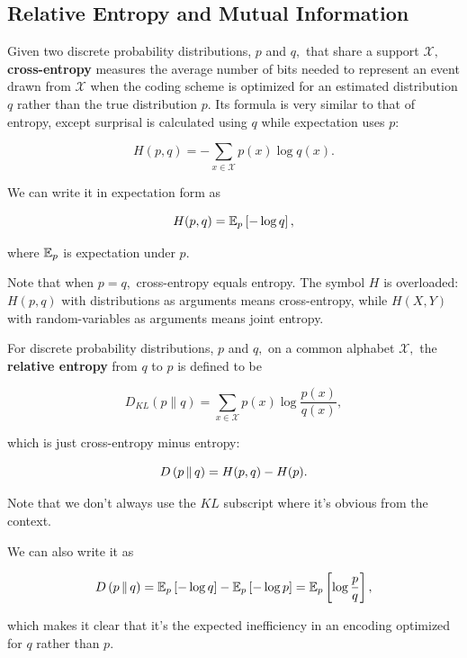 \documentclass{article}
\begin{document}
\subsection{Relative Entropy and Mutual Information}

\begin{definition}
Given two discrete probability distributions, $p$ and $q,$ that share a support $\mathcal{X},$ \textbf{cross-entropy} measures the average number of bits needed to represent an event drawn from $\mathcal{X}$ when the coding scheme is optimized for an estimated distribution $q$ rather than the true distribution $p.$ Its formula is very similar to that of \@{entropy}, except \@{surprisal} is calculated using $q$ while \@{expectation} uses $p$:

\[ H(p,q) = - \sum_{x \in \mathcal{X}} p(x) \log{q(x)}. \]

We can write it in \@{expectation} form as

\[ H(p,q) = \mathbb{E}_p \left[- \log{q}\right], \]

where $\mathbb{E}_p$ is expectation under $p.$
\end{definition}

Note that when $p = q,$ \@{cross-entropy} equals \@{entropy}. The symbol $H$ is overloaded: $H(p,q)$ with distributions as arguments means \@{cross-entropy}, while $H(X,Y)$ with \@{random-variables} as arguments means joint entropy.

\begin{definition}[KL Divergence]
	For discrete probability distributions, $p$ and $q,$ on a common \@{alphabet} $\mathcal{X},$ the \textbf{relative entropy} from $q$ to $p$ is defined to be

\[ D_{KL}(p \| q) = \sum_{x \in \mathcal{X}} p(x) \log{\frac{p(x)}{q(x)}}, \]

which is just \@{cross-entropy} minus \@{entropy}:

\[ D\left( p \,\middle\|\, q \right) = H(p,q) - H(p). \]

Note that we don't always use the $KL$ subscript where it's obvious from the context.

We can also write it as

\[ D\left( p \,\middle\|\, q \right) = \mathbb{E}_p \left[- \log{q}\right] - \mathbb{E}_p \left[- \log{p}\right]  =  \mathbb{E}_p \left[\log{\frac{p}{q}}\right], \]

which makes it clear that it's the expected inefficiency in an encoding optimized for $q$ rather than $p.$
\end{definition}
\end{document}
